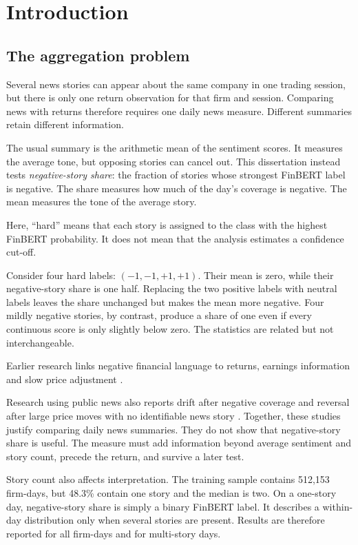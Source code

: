\chapter{Introduction}
\label{ch:introduction}

\section{The aggregation problem}

Several news stories can appear about the same company in one trading session,
but there is only one return observation for that firm and session. Comparing
news with returns therefore requires one daily news measure. Different summaries
retain different information.

The usual summary is the arithmetic mean of the sentiment scores. It measures
the average tone, but opposing stories can cancel out. This dissertation instead
tests
\emph{negative-story share}: the fraction of stories whose strongest FinBERT
label is negative. The share measures how much of the day's coverage is
negative. The mean measures the tone of the average story.

Here, ``hard'' means that each story is assigned to the class with the highest
FinBERT probability. It does not mean that the analysis estimates a confidence
cut-off.

Consider four hard labels: $(-1,-1,+1,+1)$. Their mean is zero, while their
negative-story share is one half. Replacing the two positive labels with neutral
labels leaves the share unchanged but makes the mean more negative. Four mildly
negative stories, by contrast, produce a share of one even if every continuous
score is only slightly below zero. The statistics are related but not
interchangeable.

Earlier research links negative financial language to returns, earnings
information and slow price adjustment
\citep{tetlock2007,tetlock2008words,uhl2014,heston2017}.

Research using public news also reports drift after negative coverage and
reversal after large price moves with no identifiable news story
\citep{chan2003news,savor2012information}. Together, these studies justify
comparing daily news summaries. They do not show that negative-story share is
useful. The measure must add information beyond average sentiment and story
count, precede the return, and survive a later test.

Story count also affects interpretation. The training sample contains 512,153
firm-days, but 48.3\% contain one story and the median is two. On a one-story
day, negative-story share is simply a binary FinBERT label. It describes a
within-day distribution only when several stories are present. Results are
therefore reported for all firm-days and for multi-story days.

